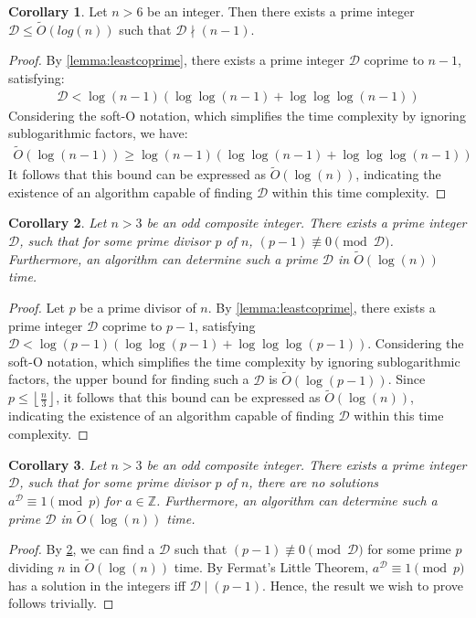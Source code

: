 \documentclass{article}
\theoremstyle{plain}
\theoremstyle{definition}
\newtheorem{corollary}{Corollary}
\newcommand{\floor}[1]{\left\lfloor #1 \right\rfloor}
\newcommand{\D}{\mathcal{D}}
\begin{document}
\begin{corollary} \label{corollary:leastcoprimebounds}
Let $n > 6$ be an integer. Then there exists a prime integer $\D \leq \tilde{O}(log(n))$ such that $\D \nmid (n-1)$. 
\end{corollary}
\begin{proof}
By \cref{lemma:leastcoprime}, there exists a prime integer $\D$ coprime to $n-1$, satisfying:
\begin{align*}
    \D < \log(n-1) \left( \log\log(n-1) + \log\log\log(n-1) \right)
\end{align*}
Considering the soft-O notation, which simplifies the time complexity by ignoring sublogarithmic factors, we have:
\begin{align*}
    \tilde{O}(\log(n-1)) \geq \log(n-1) \left( \log\log(n-1) + \log\log\log(n-1) \right)
\end{align*}
It follows that this bound can be expressed as $\tilde{O}(\log(n))$, indicating the existence of an algorithm capable of finding $\D$ within this time complexity.
\end{proof}

\begin{corollary} \label{corollary:findingprimep}
\textit{Let $n>3$ be an odd composite integer. There exists a prime integer $\D$, such that for some prime divisor $p$ of $n$, $(p-1) \not\equiv 0 \pmod{\D}$. Furthermore, an algorithm can determine such a prime $\D$ in $\tilde{O}(\log(n))$ time.}
\end{corollary}
\begin{proof}
Let $p$ be a prime divisor of $n$. By \cref{lemma:leastcoprime}, there exists a prime integer $\D$ coprime to $p-1$, satisfying $\D < \log(p-1) \left( \log\log(p-1) + \log\log\log(p-1) \right)$. Considering the soft-O notation, which simplifies the time complexity by ignoring sublogarithmic factors, the upper bound for finding such a $\D$ is $\tilde{O}(\log(p-1))$. Since $p \leq \floor{\frac{n}{3}}$, it follows that this bound can be expressed as $\tilde{O}(\log(n))$, indicating the existence of an algorithm capable of finding $\D$ within this time complexity.
\end{proof}

\begin{corollary} \label{corollary:findingprimepnonresidue}
\textit{Let $n>3$ be an odd composite integer. There exists a prime integer $\D$, such that for some prime divisor $p$ of $n$, there are no solutions $a^\D \equiv 1 \pmod{p}$ for $a \in \mathbb{Z}$. Furthermore, an algorithm can determine such a prime $\D$ in $\tilde{O}(\log(n))$ time.}
\end{corollary}
\begin{proof}
By \cref{corollary:findingprimep}, we can find a $\D$ such that $(p-1) \not\equiv 0 \pmod{\D}$ for some prime $p$ dividing $n$ in $\tilde{O}(\log(n))$ time. By Fermat's Little Theorem, $a^\D \equiv 1 \pmod{p}$ has a solution in the integers iff $\D \mid (p-1)$. Hence, the result we wish to prove follows trivially.
\end{proof}
\end{document}

